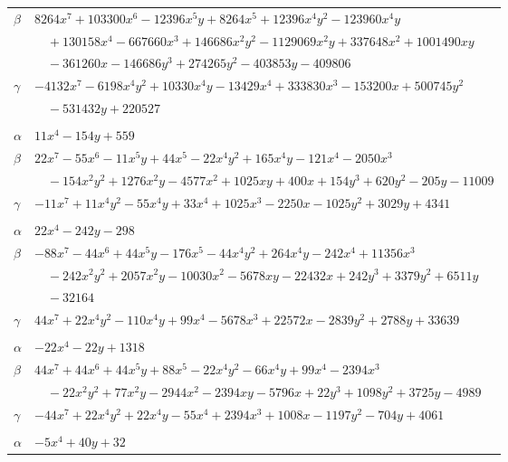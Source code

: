 \documentclass[11pt]{article}
\begin{document}
\begin{longtable}{@{}ll@{}}
$\beta$ & $8264x^{7}+103300x^{6}-12396x^{5}y+8264x^{5}+12396x^{4}y^{2}-123960x^{4}y$\\
 & $\quad +130158x^{4}-667660x^{3}+146686x^{2}y^{2}-1129069x^{2}y+337648x^{2}+1001490xy$\\
 & $\quad -361260x-146686y^{3}+274265y^{2}-403853y-409806$\\
$\gamma$ & $-4132x^{7}-6198x^{4}y^{2}+10330x^{4}y-13429x^{4}+333830x^{3}-153200x+500745y^{2}$\\
 & $\quad -531432y+220527$\\
\addlinespace[3pt]
\multicolumn{2}{@{}l}{$\{i,j\}=\{24,74\}$, $k_{ij}=2\cdot 3^{4}\cdot 5^{3}$}\\
$\alpha$ & $11x^{4}-154y+559$\\
$\beta$ & $22x^{7}-55x^{6}-11x^{5}y+44x^{5}-22x^{4}y^{2}+165x^{4}y-121x^{4}-2050x^{3}$\\
 & $\quad -154x^{2}y^{2}+1276x^{2}y-4577x^{2}+1025xy+400x+154y^{3}+620y^{2}-205y-11009$\\
$\gamma$ & $-11x^{7}+11x^{4}y^{2}-55x^{4}y+33x^{4}+1025x^{3}-2250x-1025y^{2}+3029y+4341$\\
\addlinespace[3pt]
\multicolumn{2}{@{}l}{$\{i,j\}=\{24,80\}$, $k_{ij}=2^{3}\cdot 3^{6}\cdot 17$}\\
$\alpha$ & $22x^{4}-242y-298$\\
$\beta$ & $-88x^{7}-44x^{6}+44x^{5}y-176x^{5}-44x^{4}y^{2}+264x^{4}y-242x^{4}+11356x^{3}$\\
 & $\quad -242x^{2}y^{2}+2057x^{2}y-10030x^{2}-5678xy-22432x+242y^{3}+3379y^{2}+6511y$\\
 & $\quad -32164$\\
$\gamma$ & $44x^{7}+22x^{4}y^{2}-110x^{4}y+99x^{4}-5678x^{3}+22572x-2839y^{2}+2788y+33639$\\
\addlinespace[3pt]
\multicolumn{2}{@{}l}{$\{i,j\}=\{24,100\}$, $k_{ij}=2^{7}\cdot 3^{4}$}\\
$\alpha$ & $-22x^{4}-22y+1318$\\
$\beta$ & $44x^{7}+44x^{6}+44x^{5}y+88x^{5}-22x^{4}y^{2}-66x^{4}y+99x^{4}-2394x^{3}$\\
 & $\quad -22x^{2}y^{2}+77x^{2}y-2944x^{2}-2394xy-5796x+22y^{3}+1098y^{2}+3725y-4989$\\
$\gamma$ & $-44x^{7}+22x^{4}y^{2}+22x^{4}y-55x^{4}+2394x^{3}+1008x-1197y^{2}-704y+4061$\\
\addlinespace[3pt]
\multicolumn{2}{@{}l}{$\{i,j\}=\{24,103\}$, $k_{ij}=2^{3}\cdot 3^{3}$}\\
$\alpha$ & $-5x^{4}+40y+32$\\

\end{longtable}
\end{document}
